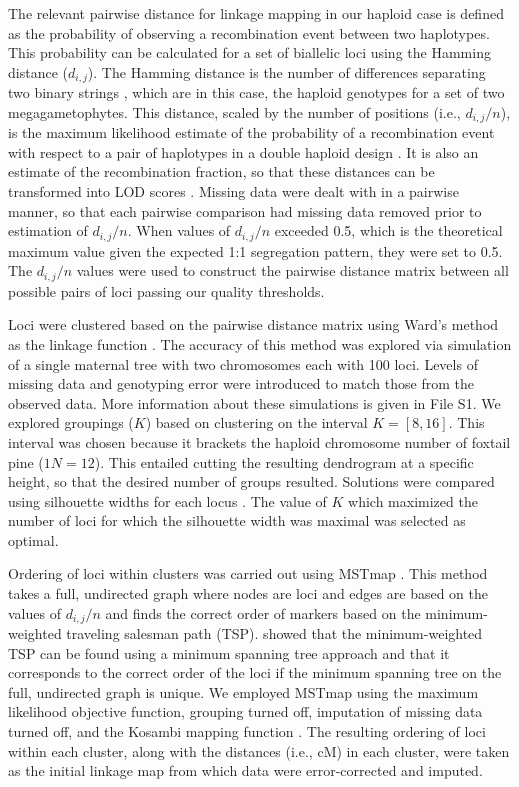 \documentclass[11pt]{article}
\begin{document}
The relevant pairwise distance for linkage mapping in our haploid case is defined as the probability 
of observing a recombination event between two haplotypes. This probability can be calculated for a set of 
biallelic loci using the Hamming distance ($d_{i,j}$).
The Hamming distance is the number of differences separating two binary strings \citep{Hamming:1950}, which are 
in this case, the haploid genotypes for a set of two megagametophytes. 
This distance, scaled by the number of positions (i.e., $d_{i,j}/n$), 
is the maximum likelihood estimate of the probability of a recombination event with respect to a pair of haplotypes 
in a double haploid design \citep{Wu:2008a}. It is also an estimate of the recombination fraction, so that these distances can be transformed into LOD 
scores \citep[see][]{Morton:1955}. Missing data were dealt with in a pairwise manner, so that each pairwise comparison had 
missing data removed prior to estimation of $d_{i,j}/n$. When values of $d_{i,j}/n$ exceeded 0.5, which is the theoretical maximum 
value given the expected 1:1 segregation pattern, they were set to 0.5.  The $d_{i,j}/n$ values were used to construct the 
pairwise distance matrix between all possible pairs of loci passing our quality thresholds.

Loci were clustered based on the pairwise distance matrix using Ward's method as the linkage function \citep{Ward:1963}.
The accuracy of this method was explored via simulation of a single maternal tree with two chromosomes each
with 100 loci. Levels of missing data and genotyping error were introduced to match those from the observed data.
More information about these simulations is given in File S1.
We explored groupings ($K$) based on clustering on the interval $K=[8,16]$. This interval was 
chosen because it brackets the haploid chromosome number of foxtail pine ($1N = 12$). This entailed 
cutting the resulting dendrogram at a specific height, so that the desired number of groups resulted. 
Solutions were compared using silhouette widths for each locus \citep{Rousseeuw:1987}. 
The value of $K$ which maximized the number of loci for which the silhouette width was maximal 
was selected as optimal.

Ordering of loci within clusters was carried out using MSTmap \citep{Wu:2008a}. This method takes a full, undirected graph where 
nodes are loci and edges are based on the values of $d_{i,j}/n$ and finds the correct order of markers based on the minimum-weighted 
traveling salesman path (TSP). \citet{Wu:2008a} showed that the minimum-weighted TSP can be found using a minimum spanning tree approach 
and that it corresponds to the correct order of the loci if the minimum spanning tree on the full, undirected graph is unique. We 
employed MSTmap using the maximum likelihood objective function, grouping turned off, imputation of missing data turned off, and the 
Kosambi mapping function \citep{Kosambi:1944}. The resulting ordering of loci within each cluster, along with the distances (i.e., cM) 
in each cluster, were taken as the initial linkage map from which data were error-corrected and imputed.
 
\end{document}
